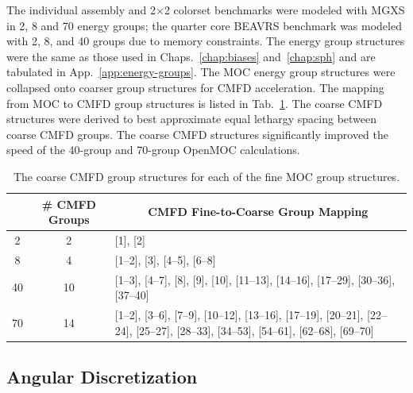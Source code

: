 The individual assembly and 2$\times$2 colorset benchmarks were modeled with \ac{MGXS} in 2, 8 and 70 energy groups; the quarter core \ac{BEAVRS} benchmark was modeled with 2, 8, and 40 groups due to memory constraints. The energy group structures were the same as those used in Chaps.~\ref{chap:biases} and~\ref{chap:sph} and are tabulated in App.~\ref{app:energy-groups}. The \ac{MOC} energy group structures were collapsed onto coarser group structures for \ac{CMFD} acceleration. The mapping from \ac{MOC} to \ac{CMFD} group structures is listed in Tab.~\ref{table:chap8-coarse-cmfd-groups}. The coarse \ac{CMFD} structures were derived to best approximate equal lethargy spacing between coarse \ac{CMFD} groups. The coarse \ac{CMFD} structures significantly improved the speed of the 40-group and 70-group OpenMOC calculations.

\begin{table}[h!]
  \centering
  \caption[Coarse \ac{CMFD} group structures]{The coarse \ac{CMFD} group structures for each of the fine \ac{MOC} group structures.}
  \small
  \label{table:chap8-coarse-cmfd-groups}
  \vspace{6pt}
  \begin{tabular}{p{1.5cm} p{1.5cm} p{7.2cm}}
  \toprule
  \rowcolor{lightgray}
  \multicolumn{1}{c}{\cellcolor{lightgray} \textbf{\# \ac{MOC} Groups}} &
  \multicolumn{1}{c}{\cellcolor{lightgray} \textbf{\# \ac{CMFD} Groups}} &
  \multicolumn{1}{c}{\cellcolor{lightgray} \textbf{\ac{CMFD} Fine-to-Coarse Group Mapping}} \\
  \midrule
  \multicolumn{1}{c}{2} & \multicolumn{1}{c}{2} & [1], [2] \\
  \midrule
  \multicolumn{1}{c}{8} & \multicolumn{1}{c}{4} & [1--2], [3], [4--5], [6--8] \\
  \midrule
  \multicolumn{1}{c}{40} & \multicolumn{1}{c}{10} & [1--3], [4--7], [8], [9], [10], [11--13], \hspace{0.8cm} [14--16], [17--29], [30--36], [37--40] \\
  \midrule
  \multicolumn{1}{c}{70} & \multicolumn{1}{c}{14} & [1--2], [3--6], [7--9], [10--12], [13--16], \hspace{0.6cm} [17--19], [20--21], [22--24], [25--27], [28--33], [34--53], [54--61], [62--68], [69--70] \\ 
  \bottomrule
\end{tabular}
\end{table}

\subsection{Angular Discretization}
\label{subsec:chap8-angular-discretizations}

